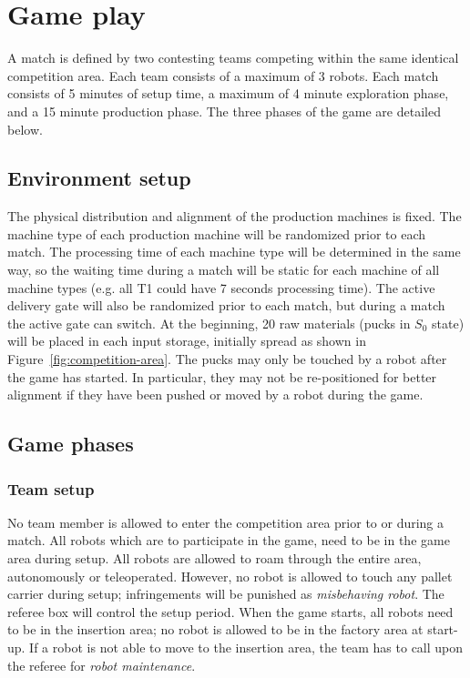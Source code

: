 \documentclass[12pt,twoside]{article}
\newcommand{\reffig}[1]{Figure~\ref{#1}}
\begin{document}


\section{Game play}
A match is defined by two contesting teams competing within the same
identical competition area. Each team consists of a maximum of 3
robots. Each match consists of 5 minutes of setup time, a maximum of 4
minute exploration phase, and a 15 minute production phase.
The three phases of the game are detailed below.

\subsection{Environment setup}
\label{sec:env-setup}

The physical distribution and alignment of the production machines is fixed. The machine
type of each production machine will be randomized prior to each
match. The processing time of each machine type will be determined in
the same way, so the waiting time during a match will be static for
each machine of all machine types (e.g. all T1 could have 7 seconds
processing time). The active delivery gate will also be randomized
prior to each match, but during a match the active gate can switch. At
the beginning, 20 raw materials (pucks in $S_0$ state) will be placed
in each input storage, initially spread as shown in
\reffig{fig:competition-area}. The pucks may only be touched by a
robot after the game has started. In particular, they may not be
re-positioned for better alignment if they have been pushed or moved by
a robot during the game.

\subsection{Game phases}
\label{sec:game-phases}

\subsubsection{Team setup}
\label{sec:team-setup}
No team member is allowed to enter the competition area prior to or
during a match. All robots which are to participate in the game, need
to be in the game area during setup. All robots are allowed to roam
through the entire area, autonomously or teleoperated. However, no
robot is allowed to touch any pallet carrier during setup;
infringements will be punished as \textit{misbehaving robot}. The
referee box will control the setup period. When the game starts, all
robots need to be in the insertion area; no robot is allowed to be in
the factory area at start-up. If a robot is not able to move to the
insertion area, the team has to call upon the referee for
\textit{robot maintenance}.
\end{document}
